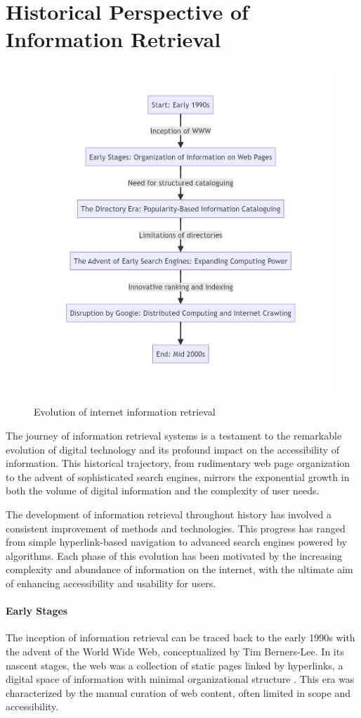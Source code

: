 \documentclass{article}
\begin{document}
\section{Historical Perspective of Information Retrieval}

\begin{figure}[h]
    \centering
    \includegraphics[width=0.5\linewidth]{ir_1.png}
    \caption{Evolution of internet information retrieval}
    \label{fig:information-retrieval}
\end{figure}

The journey of information retrieval systems is a testament to the remarkable evolution of digital technology and its profound impact on the accessibility of information. This historical trajectory, from rudimentary web page organization to the advent of sophisticated search engines, mirrors the exponential growth in both the volume of digital information and the complexity of user needs.

The development of information retrieval throughout history has involved a consistent improvement of methods and technologies. This progress has ranged from simple hyperlink-based navigation to advanced search engines powered by algorithms. Each phase of this evolution has been motivated by the increasing complexity and abundance of information on the internet, with the ultimate aim of enhancing accessibility and usability for users.

\paragraph{Early Stages} The inception of information retrieval can be traced back to the early 1990s with the advent of the World Wide Web, conceptualized by Tim Berners-Lee. In its nascent stages, the web was a collection of static pages linked by hyperlinks, a digital space of information with minimal organizational structure \citep{berners1994world}. This era was characterized by the manual curation of web content, often limited in scope and accessibility.
\end{document}
